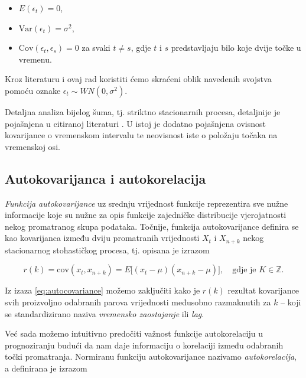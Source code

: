 \documentclass[a4paper,12pt,oneside]{memoir}
\begin{document}
                    \begin{itemize}
                        \item $E(\epsilon_t)=0$,
                        \item $\mathrm{Var}(\epsilon_t)=\sigma^2$,
                        \item $\mathrm{Cov}(\epsilon_t,\epsilon_s)=0$ za svaki $t\neq s$, gdje $t$ i $s$ predstavljaju bilo koje dvije točke u vremenu.
                    \end{itemize}

                    Kroz literaturu i ovaj rad koristiti ćemo skraćeni oblik navedenih svojstva pomoću oznake $\epsilon_t\sim WN(0,\sigma^2)$.

                    Detaljna analiza bijelog šuma, tj. striktno stacionarnih procesa, detaljnije je pojašnjena u citiranoj literaturi \cite{Priestley}\cite{Bahovec}. U istoj je dodatno pojašnjena ovisnost kovarijance o vremenskom intervalu te neovisnost iste o položaju točaka na vremenskoj osi.

            \subsection{Autokovarijanca i autokorelacija}

                \textit{Funkcija autokovarijance} uz srednju vrijednost funkcije reprezentira sve nužne informacije koje su nužne za opis funkcije zajedničke distribucije vjerojatnosti nekog promatranog skupa podataka. Točnije, funkcija autokovarijance definira se kao kovarijanca između dviju promatranih vrijednosti $X_t$ i $X_{n+k}$ nekog stacionarnog stohastičkog procesa, tj. opisana je izrazom

                \begin{equation}
                    r(k)=\mathrm{cov}(x_t,x_{n+k})=E\big[(x_t-\mu)(x_{n+k}-\mu)\big], \quad \text{gdje je } K\in \mathbb{Z}.
                    \label{eq:autocovariance}
                \end{equation}

                Iz izaza \eqref{eq:autocovariance} možemo zaključiti kako je $r(k)$ rezultat kovarijance svih proizvoljno odabranih parova vrijednosti međusobno razmaknutih za $k$ -- koji se standardizirano naziva \textit{vremensko zaostajanje} ili \textit{lag}.
                
                Već sada možemo intuitivno predočiti važnost funkcije autokorelaciju u prognoziranju budući da nam daje informaciju o korelaciji između odabranih točki promatranja. Normiranu funkciju autokovarijance nazivamo \textit{autokorelacija}, a definirana je izrazom
\end{document}
